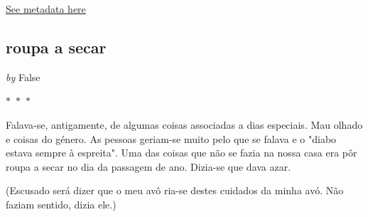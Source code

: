 
\hyperref[table:\arabic{tablecounter}]{See metadata here}

\newpage

\begin{center}

    \section{  roupa a secar  }

    
            
                \textit{by} False
            
        

     
    
    

$\ast$~$\ast$~$\ast$



\end{center}

\begin{center}
    \begin{minipage}{0.9\textwidth}
        \setlength{\parskip}{0.2cm}
        \setlength{\parindent}{0cm}
        \fontsize{12pt}{14pt}\selectfont
        


Falava-se, antigamente, de algumas coisas associadas a dias especiais.
Mau olhado e coisas do género. As pessoas geriam-se muito pelo que se
falava e o "diabo estava sempre à espreita". Uma das coisas que não se
fazia na nossa casa era pôr roupa a secar no dia da passagem de ano.
Dizia-se que dava azar.

(Escusado será dizer que o meu avô ria-se destes cuidados da minha avó. Não
faziam sentido, dizia ele.)

    \end{minipage}
\end{center}

